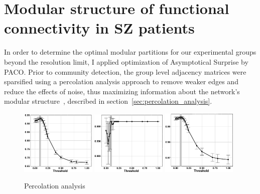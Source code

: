 
\section{Modular structure of functional connectivity in SZ patients}
In order to determine the optimal modular partitions for our experimental groups beyond the resolution limit, I applied optimization of Asymptotical Surprise by PACO.
Prior to community detection, the group level adjacency matrices were sparsified using a percolation analysis approach to remove weaker edges and reduce the effects of noise, thus maximizing information about the network's modular structure~\cite{nicolini2017,bardella2016a,gallos2012}, described in section~\ref{sec:percolation_analysis}.

\begin{figure}
\centering
\includegraphics[width=0.32\textwidth]{images/schizo/schizo_fig_3a.png}
\includegraphics[width=0.32\textwidth]{images/schizo/schizo_fig_3b.png}
\includegraphics[width=0.32\textwidth]{images/schizo/schizo_fig_3c.png}
\caption{Percolation analysis}
\label{fig:schizo_percolation}
\end{figure}

